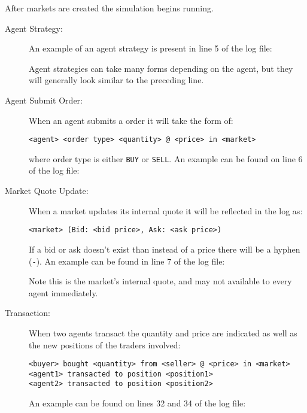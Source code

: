\documentclass[11pt]{article}
\newcommand{\logfile}{../simulations_test_0_0_2014-05-12-13-36-04.txt}
\begin{document}
After markets are created the simulation begins running.
\begin{description}
\item[Agent Strategy:] An example of an agent strategy is present in line 5 of the log file:

  
  
  Agent strategies can take many forms depending on the agent, but they will generally look similar to the preceding line.

\item[Agent Submit Order:] When an agent submits a order it will take the form of:

\begin{verbatim}
<agent> <order type> <quantity> @ <price> in <market>
\end{verbatim}

where order type is either \verb|BUY| or \verb|SELL|. An example can be found on line 6 of the log file:




\item[Market Quote Update:] When a market updates its internal quote it will be reflected in the log as:

\begin{verbatim}
<market> (Bid: <bid price>, Ask: <ask price>)
\end{verbatim}

If a bid or ask doesn't exist than instead of a price there will be a hyphen
(\texttt{-}). An example can be found in line 7 of the log file:



Note this is the market's internal quote, and may not available to every agent immediately.

\item[Transaction:] When two agents transact the quantity and price are indicated as well as the new positions of the traders involved:

\begin{verbatim}
<buyer> bought <quantity> from <seller> @ <price> in <market>
<agent1> transacted to position <position1>
<agent2> transacted to position <position2>
\end{verbatim}

An example can be found on lines 32 and 34 of the log file:




\end{description}
\end{document}
